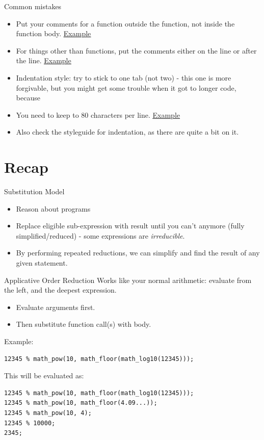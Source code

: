 \documentclass[10pt]{beamer}
\begin{document}
\begin{frame}[fragile]{Common mistakes}
  \begin{itemize}
    \item Put your comments for a function outside the function, not inside the function body. \href{https://share.sourceacademy.nus.edu.sg/functioncomments}{\underline{Example}}
    \item For things other than functions, put the comments either on the line or after the line. \href{https://share.sourceacademy.nus.edu.sg/othercomments}{\underline{Example}}
    \item Indentation style: try to stick to one tab (not two) - this one is more forgivable, but you might get some trouble when it got to longer code, because
    \item You need to keep to 80 characters per line. \href{https://share.sourceacademy.nus.edu.sg/indentationonetab}{\underline{Example}}
    \item Also check the styleguide for indentation, as there are quite a bit on it. 
  \end{itemize}
\end{frame}

\section[Recap]{Recap}

\begin{frame}[fragile]{Substitution Model}
  \begin{itemize}
    \item Reason about programs
    \item Replace eligible sub-expression with result until you can't anymore (fully simplified/reduced) - some expressions are \textit{irreducible}.
    \item By performing repeated reductions, we can simplify and find the result of any given statement.
  \end{itemize}  
\end{frame}

\begin{frame}[fragile]{Applicative Order Reduction}
  Works like your normal arithmetic: evaluate from the left, and the deepest expression.
  \begin{itemize}
    \item Evaluate arguments first.
    \item Then substitute function call(s) with body.
  \end{itemize}
  Example:
  \begin{verbatim}      
12345 % math_pow(10, math_floor(math_log10(12345)));
  \end{verbatim}   
  This will be evaluated as:
  \begin{verbatim}
12345 % math_pow(10, math_floor(math_log10(12345)));
12345 % math_pow(10, math_floor(4.09...));
12345 % math_pow(10, 4);
12345 % 10000;
2345;
  \end{verbatim}
\end{frame}
\end{document}
